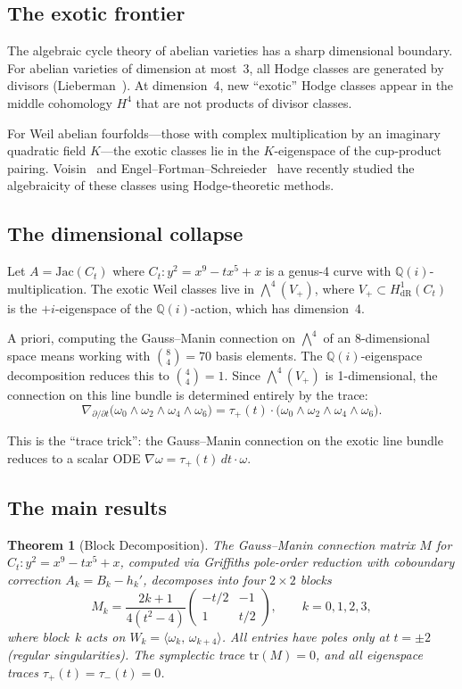 \documentclass[11pt]{article}
\theoremstyle{plain}
\newtheorem{theorem}{Theorem}[section]
\theoremstyle{definition}
\theoremstyle{remark}
\newcommand{\Q}{\mathbb{Q}}
\newcommand{\tr}{\mathrm{tr}}
\newcommand{\HdR}{H^1_{\mathrm{dR}}}
\begin{document}
\subsection{The exotic frontier}

The algebraic cycle theory of abelian varieties has a sharp dimensional
boundary. For abelian varieties of dimension at most~3, all Hodge classes
are generated by divisors (Lieberman~\cite{Lieberman1968}). At dimension~4,
new ``exotic'' Hodge classes appear in the middle cohomology $H^4$
that are not products of divisor classes.

For Weil abelian fourfolds---those with complex multiplication by an
imaginary quadratic field $K$---the exotic classes lie in the
$K$-eigenspace of the cup-product pairing. Voisin~\cite{Voisin2024}
and Engel--Fortman--Schreieder~\cite{EFS2025} have recently studied
the algebraicity of these classes using Hodge-theoretic methods.

\subsection{The dimensional collapse}

Let $A = \mathrm{Jac}(C_t)$ where $C_t\colon y^2 = x^9 - tx^5 + x$
is a genus-4 curve with $\Q(i)$-multiplication. The exotic Weil
classes live in $\bigwedge^4(V_+)$, where $V_+ \subset \HdR(C_t)$ is
the $+i$-eigenspace of the $\Q(i)$-action, which has dimension~4.

A priori, computing the Gauss--Manin connection on $\bigwedge^4$ of an
8-dimensional space means working with $\binom{8}{4} = 70$ basis elements.
The $\Q(i)$-eigenspace decomposition reduces this to $\binom{4}{4} = 1$.
Since $\bigwedge^4(V_+)$ is 1-dimensional, the connection on this line
bundle is determined entirely by the trace:
\[
  \nabla_{\partial/\partial t}\bigl(\omega_0 \wedge \omega_2 \wedge
  \omega_4 \wedge \omega_6\bigr) = \tau_+(t) \cdot
  \bigl(\omega_0 \wedge \omega_2 \wedge \omega_4 \wedge \omega_6\bigr).
\]

This is the ``trace trick'': the Gauss--Manin connection on the
exotic line bundle reduces to a scalar ODE $\nabla\omega = \tau_+(t)\,dt
\cdot \omega$.

\subsection{The main results}

\begin{theorem}[Block Decomposition]\label{thm:A}
The Gauss--Manin connection matrix $M$ for $C_t\colon y^2 = x^9 - tx^5 + x$,
computed via Griffiths pole-order reduction with coboundary correction
$A_k = B_k - h_k'$, decomposes into four $2 \times 2$ blocks
\[
  M_k = \frac{2k+1}{4(t^2-4)}
  \begin{pmatrix} -t/2 & -1 \\ 1 & t/2 \end{pmatrix},
  \qquad k = 0,1,2,3,
\]
where block~$k$ acts on $W_k = \langle\omega_k,\, \omega_{k+4}\rangle$.
All entries have poles only at $t = \pm 2$ (regular singularities).
The symplectic trace $\tr(M) = 0$, and all eigenspace traces
$\tau_+(t) = \tau_-(t) = 0$.
\end{theorem}
\end{document}
